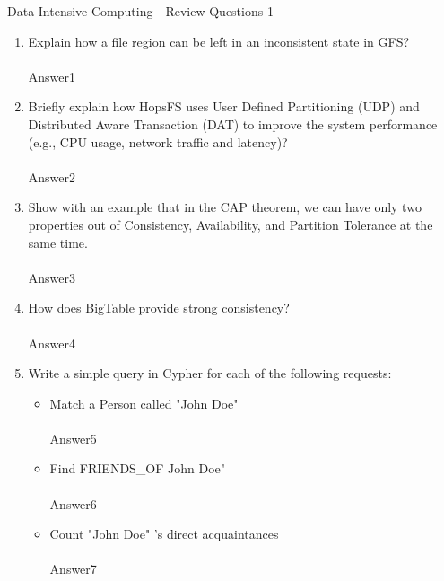\documentclass[]{report}
\begin{document}
\begin{center}
 {\Large Data Intensive Computing - Review Questions 1}
\end{center}
\vspace{1cm}
\justify
\begin{enumerate}
 \item Explain how a file region can be left in an inconsistent state in GFS?\\\\
 Answer1
 
 \item Briefly explain how HopsFS uses User Defined Partitioning (UDP) and Distributed Aware Transaction (DAT) to improve the system performance (e.g., CPU usage, network traffic and latency)?\\\\
 Answer2
 
 \item Show with an example that in the CAP theorem, we can have only two properties out of Consistency, Availability, and Partition Tolerance at the same time.\\\\
 Answer3
 
 \item How does BigTable provide strong consistency?\\\\
 Answer4
 
 \item Write a simple query in Cypher for each of the following requests:
 \begin{itemize}
    	\item Match a Person called "John Doe"\\\\
	Answer5
        \item Find FRIENDS\_OF John Doe"\\\\
        Answer6
        \item Count "John Doe" 's direct acquaintances\\\\
        Answer7
  \end{itemize}

\end{enumerate}
\end{document}
